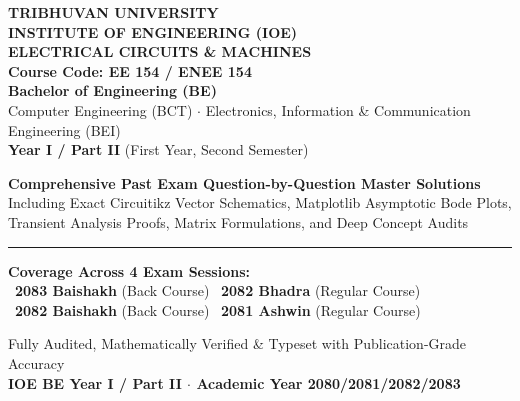 \documentclass[11pt,a4paper,oneside]{article}
\begin{document}
\begin{titlepage}
\centering
\vspace*{1.5cm}
{\huge\bfseries\sffamily\color{primaryblue} TRIBHUVAN UNIVERSITY\\[0.3em] INSTITUTE OF ENGINEERING (IOE)}\\[1.5cm]

{\LARGE\bfseries\sffamily ELECTRICAL CIRCUITS \& MACHINES}\\[0.4em]
{\Large\bfseries\sffamily Course Code: EE 154 / ENEE 154}\\[1.2cm]

{\large\bfseries Bachelor of Engineering (BE)}\\[0.3em]
{\normalsize Computer Engineering (BCT) $\cdot$ Electronics, Information \& Communication Engineering (BEI)}\\[0.3em]
{\normalsize \textbf{Year I / Part II} (First Year, Second Semester)}\\[1.8cm]

\begin{tcolorbox}[colback=primaryblue!5,colframe=primaryblue,arc=3mm,boxrule=1.2pt,width=0.92\textwidth]
\centering
\vspace{0.4em}
{\large\bfseries\sffamily Comprehensive Past Exam Question-by-Question Master Solutions}\\[0.4em]
{\normalsize Including Exact Circuitikz Vector Schematics, Matplotlib Asymptotic Bode Plots, Transient Analysis Proofs, Matrix Formulations, and Deep Concept Audits}\\[0.4em]
\vspace{0.2em}
\hrule\vspace{0.6em}
\textbf{Coverage Across 4 Exam Sessions:}\\[0.2em]
\textbullet\ \textbf{2083 Baishakh} (Back Course) \quad \textbullet\ \textbf{2082 Bhadra} (Regular Course)\\[0.2em]
\textbullet\ \textbf{2082 Baishakh} (Back Course) \quad \textbullet\ \textbf{2081 Ashwin} (Regular Course)
\vspace{0.4em}
\end{tcolorbox}

\vfill
{\footnotesize\sffamily Fully Audited, Mathematically Verified \& Typeset with Publication-Grade Accuracy}\\[0.5em]
{\small\bfseries\color{primaryblue} IOE BE Year I / Part II $\cdot$ Academic Year 2080/2081/2082/2083}
\vspace*{1cm}
\end{titlepage}
\end{document}
